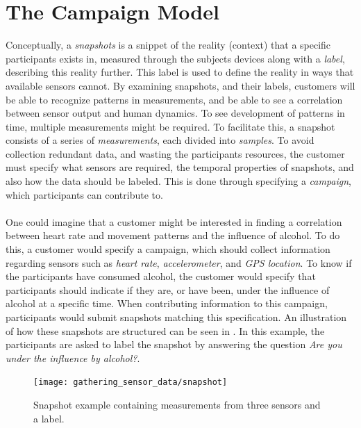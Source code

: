 
\section{The Campaign Model}
Conceptually, a \emph{snapshots} is a snippet of the reality (context) that a specific participants exists in, measured through the subjects devices along with a \emph{label}, describing this reality further. This label is used to define the reality in ways that available sensors cannot. By examining snapshots, and their labels, customers will be able to recognize patterns in measurements, and be able to see a correlation between sensor output and human dynamics. To see development of patterns in time, multiple measurements might be required. To facilitate this, a snapshot consists of a series of \emph{measurements}, each divided into \emph{samples}. To avoid collection redundant data, and wasting the participants resources, the customer must specify what sensors are required, the temporal properties of snapshots, and also how the data should be labeled. This is done through specifying a \emph{campaign}, which participants can contribute to. 
\\\\
One could imagine that a customer might be interested in finding a correlation between heart rate and movement patterns and the influence of alcohol. To do this, a customer would specify a campaign, which should collect information regarding sensors such as \emph{heart rate}, \emph{accelerometer}, and \emph{GPS location}. To know if the participants have consumed alcohol, the customer would specify that participants should indicate if they are, or have been, under the influence of alcohol at a specific time. When contributing information to this campaign, participants would submit snapshots matching this specification. An illustration of how these snapshots are structured can be seen in  . In this example, the participants are asked to label the snapshot by answering the question \emph{Are you under the influence by alcohol?}.

\begin{figure}[!htbp]
    \centering
    \texttt{[image: gathering\_sensor\_data/snapshot]}
    \caption{Snapshot example containing measurements from three sensors and a label.}
    \label{fig:snapshot_example}
\end{figure}
\FloatBarrier


